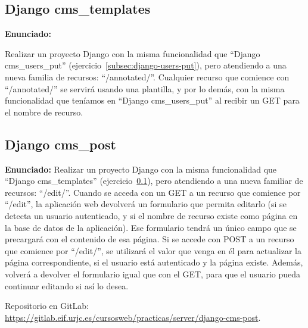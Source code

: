 \subsection{Django cms\_templates}
\label{subsec:django-templates}

\textbf{Enunciado:}

Realizar un proyecto Django con la misma funcionalidad que ``Django cms\_users\_put'' (ejercicio~\ref{subsec:django-users-put}), pero atendiendo a una nueva familia de recursos: ``/annotated/''. Cualquier recurso que comience con ``/annotated/'' se servirá usando una plantilla, y por lo demás, con la misma funcionalidad que teníamos en ``Django cms\_users\_put'' al recibir un GET para el nombre de recurso.


\subsection{Django cms\_post}
\label{subsec:django-post}

\textbf{Enunciado:}
 Realizar un proyecto Django con la misma funcionalidad que ``Django cms\_templates'' (ejercicio~\ref{subsec:django-templates}), pero atendiendo a una nueva familiar de recursos: ``/edit/''. Cuando se acceda con un GET a un recurso que comience por ``/edit'', la aplicación web devolverá un formulario que permita editarlo (si se detecta un usuario autenticado, y si el nombre de recurso existe como página en la base de datos de la aplicación). Ese formulario tendrá un único campo que se precargará con el contenido de esa página. Si se accede con POST a un recurso que comience por ``/edit/'', se utilizará el valor que venga en él para actualizar la página correspondiente, si el usuario está autenticado y la página existe. Además, volverá a devolver el formulario igual que con el GET, para que el usuario pueda continuar editando si así lo desea.
 
Repositorio en GitLab: \\
\url{https://gitlab.eif.urjc.es/cursosweb/practicas/server/django-cms-post}.

